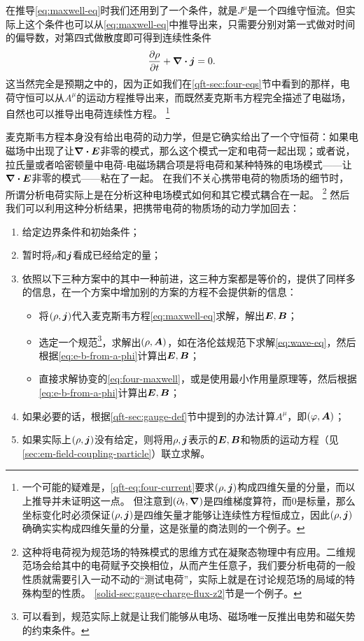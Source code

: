 在推导\eqref{eq:maxwell-eq}时我们还用到了一个条件，就是$J^\mu$是一个四维守恒流。但实际上这个条件也可以从\eqref{eq:maxwell-eq}中推导出来，只需要分别对第一式做对时间的偏导数，对第四式做散度即可得到连续性条件
\begin{equation}
    \pdv{\rho}{t} + \div{\vb*{j}} = 0.
    \label{eq:charge-transportation}
\end{equation}
这当然完全是预期之中的，因为正如我们在\ref{qft-sec:four-eqs}节中看到的那样，电荷守恒可以从$A^\mu$的运动方程推导出来，而既然麦克斯韦方程完全描述了电磁场，自然也可以推导出电荷连续性方程。%
\footnote{一个可能的疑难是，\eqref{qft-eq:four-current}要求$(\rho, \vb*{j})$构成四维矢量的分量，而以上推导并未证明这一点。
但注意到$(\partial_t, \grad)$是四维梯度算符，而$0$是标量，那么坐标变化时必须保证$(\rho, \vb*{j})$是四维矢量才能够让连续性方程恒成立，因此$(\rho, \vb*{j})$确确实实构成四维矢量的分量，这是张量的商法则的一个例子。
}%

麦克斯韦方程本身没有给出电荷的动力学，但是它确实给出了一个守恒荷：如果电磁场中出现了让$\div{\vb*{E}}$非零的模式，那么这个模式一定和电荷一起出现；或者说，拉氏量或者哈密顿量中电荷-电磁场耦合项是将电荷和某种特殊的电场模式——让$\div{\vb*{E}}$非零的模式——粘在了一起。
在我们不关心携带电荷的物质场的细节时，所谓分析电荷实际上是在分析这种电场模式如何和其它模式耦合在一起。%
\footnote{
    这种将电荷视为规范场的特殊模式的思维方式在凝聚态物理中有应用。二维规范场会给其中的电荷赋予交换相位，从而产生任意子，我们要分析电荷的一般性质就需要引入一动不动的“测试电荷”，实际上就是在讨论规范场的局域的特殊构型的性质。
    \ref{solid-sec:gauge-charge-flux-z2}节是一个例子。
}%
然后我们可以利用这种分析结果，把携带电荷的物质场的动力学加回去：
\begin{enumerate}
    \item 给定边界条件和初始条件；
    \item 暂时将$\rho$和$\vb*{j}$看成已经给定的量；
    \item 依照以下三种方案中的其中一种前进，这三种方案都是等价的，提供了同样多的信息，在一个方案中增加别的方案的方程不会提供新的信息：
    \begin{itemize}
        \item 将$(\rho, \vb*{j})$代入麦克斯韦方程\eqref{eq:maxwell-eq}求解，解出$\vb*{E}, \vb*{B}$；
        \item 选定一个规范\footnote{可以看到，规范实际上就是让我们能够从电场、磁场唯一反推出电势和磁矢势的约束条件。}，求解出$(\rho, \vb*{A})$，如在洛伦兹规范下求解\eqref{eq:wave-eq}，然后根据\eqref{eq:e-b-from-a-phi}计算出$\vb*{E}, \vb*{B}$；
        \item 直接求解协变的\eqref{eq:four-maxwell}，或是使用最小作用量原理等，然后根据\eqref{eq:e-b-from-a-phi}计算出$\vb*{E}, \vb*{B}$；
    \end{itemize}
    \item 如果必要的话，根据\ref{qft-sec:gauge-def}节中提到的办法计算$A^\mu$，即$(\varphi, \vb*{A})$；
    \item 如果实际上$(\rho, \vb*{j})$没有给定，则将用$\rho, \vb*{j}$表示的$\vb*{E}, \vb*{B}$和物质的运动方程（见\autoref{sec:em-field-coupling-particle}）联立求解。
\end{enumerate}

